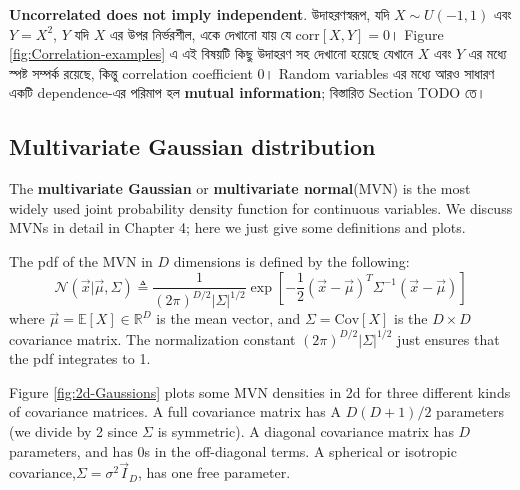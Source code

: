 \documentclass[graybox, envcountchap, twocolumn]{styles/svmult}
\begin{document}
\textbf{Uncorrelated does not imply independent}. {\bengalifont উদাহরণস্বরূপ, যদি $X \sim U(-1,1)$ এবং $Y = X^2$, $Y$ যদি $X$ এর উপর নির্ভরশীল,  একে দেখানো যায় যে $ \text{corr}[X, Y]=0$। Figure \ref{fig:Correlation-examples} এ এই বিষয়টি কিছু উদাহরণ সহ দেখানো হয়েছে যেখানে $X$ এবং $Y$ এর মধ্যে স্পষ্ট সম্পর্ক রয়েছে, কিন্তু correlation coefficient 0। Random variables এর মধ্যে আরও সাধারণ একটি dependence-এর পরিমাপ হল \textbf{mutual information}; বিস্তারিত Section TODO তে।}



\subsection{Multivariate Gaussian distribution}
\label{sec:MVN}
The \textbf{multivariate Gaussian} or \textbf{multivariate normal}(MVN) is the most widely used joint probability density function for continuous variables. We discuss MVNs in detail in Chapter 4; here we just give some definitions and plots.

The pdf of the MVN in $D$ dimensions is defined by the following:
\begin{equation}
\mathcal{N}(\vec{x}|\vec{\mu},\Sigma) \triangleq \dfrac{1}{(2\pi)^{D/2}|\Sigma|^{1/2}}\exp\left[-\dfrac{1}{2}(\vec{x}-\vec{\mu})^T\Sigma^{-1}(\vec{x}-\vec{\mu})\right]
\end{equation}
where $\vec{\mu}=\mathbb{E}[X] \in \mathbb{R}^D$ is the mean vector, and $\Sigma=\text{Cov}[X]$ is the $D \times D$ covariance matrix. The normalization constant $(2\pi)^{D/2}|\Sigma|^{1/2}$ just ensures that the pdf integrates to 1.

Figure \ref{fig:2d-Gaussions} plots some MVN densities in 2d for three different kinds of covariance matrices. A full covariance matrix has A $D(D+1)/2$ parameters (we divide by 2 since $\Sigma$ is symmetric). A diagonal covariance matrix has $D$ parameters, and has 0s in the off-diagonal terms. A spherical or isotropic covariance,$\Sigma=\sigma^2\vec{I}_D$, has one free parameter.
\end{document}
